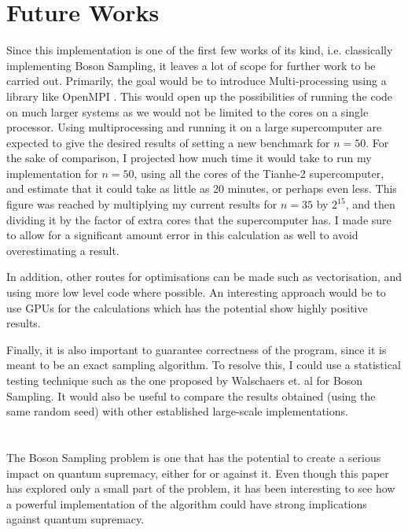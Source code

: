 \documentclass[ %
                    author={Manan Vaswani},
                supervisor={Dr. Raphael Clifford},
                    degree={MEng},
                     title={A multi-core CPU implementation of the classical Boson Sampling algorithm},
                  subtitle={},
                      type={},
                      year={2019} ]{dissertation}
\theoremstyle{plain}
\theoremstyle{definition}
\begin{document}
\section{Future Works} \label{sec:future}
Since this implementation is one of the first few works of its kind, i.e. classically implementing Boson Sampling, it leaves a lot of scope for further work to be carried out. Primarily, the goal would be to introduce Multi-processing using a library like OpenMPI \cite{openmpi}. This would open up the possibilities of running the code on much larger systems as we would not be limited to the cores on a single processor. Using multiprocessing and running it on a large supercomputer are expected to give the desired results of setting a new benchmark for $n=50$. For the sake of comparison, I projected how much time it would take to run my implementation for $n=50$, using all the cores of the Tianhe-2 supercomputer, and estimate that it could take as little as 20 minutes, or perhaps even less. This figure was reached by multiplying my current results for $n=35$ by $2^{15}$, and then dividing it by the factor of extra cores that the supercomputer has. I made sure to allow for a significant amount error in this calculation as well to avoid overestimating a result.

In addition, other routes for optimisations can be made such as vectorisation, and using more low level code where possible. An interesting approach would be to use GPUs for the calculations which has the potential show highly positive results.

Finally, it is also important to guarantee correctness of the program, since it is meant to be an exact sampling algorithm. To resolve this, I could use a statistical testing technique such as the one proposed by Walschaers et. al \cite{2016NJPh...18c2001W} for Boson Sampling. It would also be useful to compare the results obtained (using the same random seed) with other established large-scale implementations.
\\
\\
\\
The Boson Sampling problem is one that has the potential to create a serious impact on quantum supremacy, either for or against it. Even though this paper has explored only a small part of the problem, it has been interesting to see how a powerful implementation of the algorithm could have strong implications against quantum supremacy.


\end{document}
